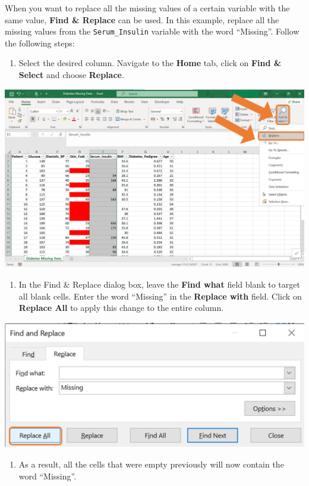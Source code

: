 \documentclass[
]{book}
\providecommand{\tightlist}{%
  \setlength{\itemsep}{0pt}\setlength{\parskip}{0pt}}
\begin{document}
When you want to replace all the missing values of a certain variable with the same value, \textbf{Find \& Replace} can be used. In this example, replace all the missing values from the \texttt{Serum\_Insulin} variable with the word ``Missing''. Follow the following steps:

\newpage

\begin{enumerate}
\def\labelenumi{\arabic{enumi}.}
\tightlist
\item
  Select the desired column. Navigate to the \textbf{Home} tab, click on \textbf{Find \& Select} and choose \textbf{Replace}.
\end{enumerate}

\begin{center}\includegraphics[width=0.8\linewidth]{Figures/missing_3_1} \end{center}

\begin{enumerate}
\def\labelenumi{\arabic{enumi}.}
\setcounter{enumi}{1}
\tightlist
\item
  In the Find \& Replace dialog box, leave the \textbf{Find what} field blank to target all blank cells. Enter the word ``Missing'' in the \textbf{Replace with} field. Click on \textbf{Replace All} to apply this change to the entire column.
\end{enumerate}

\begin{center}\includegraphics[width=0.5\linewidth]{Figures/missing_3_2} \end{center}

\begin{enumerate}
\def\labelenumi{\arabic{enumi}.}
\setcounter{enumi}{2}
\tightlist
\item
  As a result, all the cells that were empty previously will now contain the word ``Missing''.
\end{enumerate}
\end{document}
